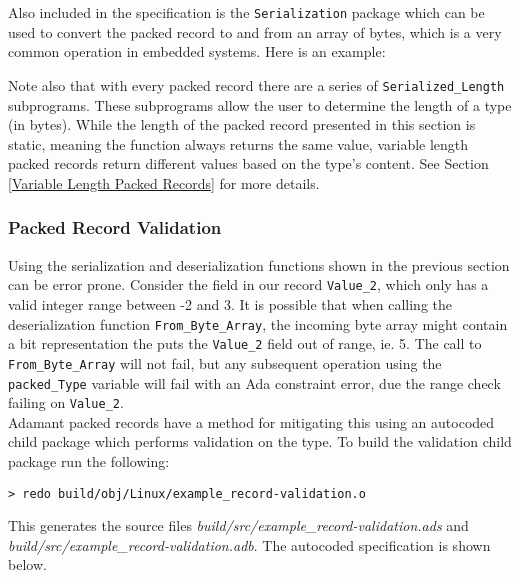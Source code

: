 Also included in the specification is the \texttt{Serialization} package which can be used to convert the packed record to and from an array of bytes, which is a very common operation in embedded systems. Here is an example:


Note also that with every packed record there are a series of \texttt{Serialized\_Length} subprograms. These subprograms allow the user to determine the length of a type (in bytes). While the length of the packed record presented in this section is static, meaning the function always returns the same value, variable length packed records return different values based on the type's content. See Section \ref{Variable Length Packed Records} for more details.

\subsubsection{Packed Record Validation} \label{Packed Record Validation}

Using the serialization and deserialization functions shown in the previous section can be error prone. Consider the field in our record \texttt{Value\_2}, which only has a valid integer range between -2 and 3. It is possible that when calling the deserialization function \texttt{From\_Byte\_Array}, the incoming byte array might contain a bit representation the puts the \texttt{Value\_2} field out of range, ie. 5. The call to \texttt{From\_Byte\_Array} will not fail, but any subsequent operation using the \texttt{packed\_Type} variable will fail with an Ada constraint error, due the range check failing on \texttt{Value\_2}. \\

Adamant packed records have a method for mitigating this using an autocoded child package which performs validation on the type. To build the validation child package run the following:

\vspace{5mm} %
\begin{verbatim}
> redo build/obj/Linux/example_record-validation.o
\end{verbatim}
\vspace{5mm} %

This generates the source files \textit{build/src/example\_record-validation.ads} and \textit{build/src/example\_record-validation.adb}. The autocoded specification is shown below.

